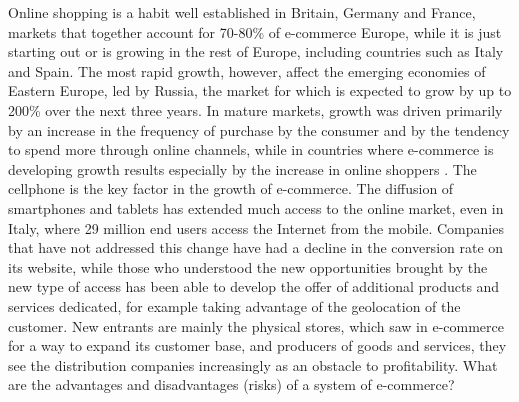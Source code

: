 \newline
Online shopping is a habit well established in Britain, Germany and France, markets that together account for 70-80\% of e-commerce Europe, while it is just starting out or is growing in the rest of Europe, including countries such as Italy and Spain. The most rapid growth, however, affect the emerging economies of Eastern Europe, led by Russia, the market for which is expected to grow by up to 200\% over the next three years.
\newline
In mature markets, growth was driven primarily by an increase in the frequency of purchase by the consumer and by the tendency to spend more through online channels, while in countries where e-commerce is developing growth results especially by the increase in online shoppers \cite{e_commerce_in_italy}.
\newline
The cellphone is the key factor in the growth of e-commerce. The diffusion of smartphones and tablets has extended much access to the online market, even in Italy, where 29 million end users access the Internet from the mobile. Companies that have not addressed this change have had a decline in the conversion rate on its website, while those who understood the new opportunities brought by the new type of access has been able to develop the offer of additional products and services dedicated, for example taking advantage of the geolocation of the customer. New entrants are mainly the physical stores, which saw in e-commerce for a way to expand its customer base, and producers of goods and services, they see the distribution companies increasingly as an obstacle to profitability.
\newline
What are the advantages and disadvantages (risks) of a system of e-commerce?
